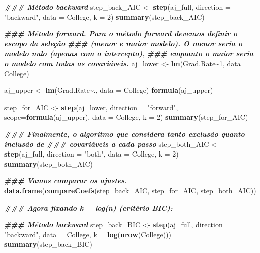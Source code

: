 \documentclass[
]{article}
\newenvironment{Shaded}{\begin{snugshade}}{\end{snugshade}}
\newcommand{\AttributeTok}[1]{\textcolor[rgb]{0.13,0.29,0.53}{#1}}
\newcommand{\DecValTok}[1]{\textcolor[rgb]{0.00,0.00,0.81}{#1}}
\newcommand{\DocumentationTok}[1]{\textcolor[rgb]{0.56,0.35,0.01}{\textbf{\textit{#1}}}}
\newcommand{\FunctionTok}[1]{\textcolor[rgb]{0.13,0.29,0.53}{\textbf{#1}}}
\newcommand{\NormalTok}[1]{#1}
\newcommand{\OtherTok}[1]{\textcolor[rgb]{0.56,0.35,0.01}{#1}}
\newcommand{\SpecialCharTok}[1]{\textcolor[rgb]{0.81,0.36,0.00}{\textbf{#1}}}
\newcommand{\StringTok}[1]{\textcolor[rgb]{0.31,0.60,0.02}{#1}}
\begin{document}
{\begin{Shaded}
\begin{Highlighting}[]
\DocumentationTok{\#\#\# Método backward}
\NormalTok{step\_back\_AIC }\OtherTok{\textless{}{-}} \FunctionTok{step}\NormalTok{(aj\_full, }\AttributeTok{direction =} \StringTok{"backward"}\NormalTok{, }\AttributeTok{data =}\NormalTok{ College, }\AttributeTok{k =} \DecValTok{2}\NormalTok{)}
\FunctionTok{summary}\NormalTok{(step\_back\_AIC)}

\DocumentationTok{\#\#\# Método forward. Para o método forward devemos definir o escopo da seleção}
\DocumentationTok{\#\#\# (menor e maior modelo). O menor seria o modelo nulo (apenas com o intercepto),}
\DocumentationTok{\#\#\# enquanto o maior seria o modelo com todas as covariáveis.}
\NormalTok{aj\_lower }\OtherTok{\textless{}{-}} \FunctionTok{lm}\NormalTok{(Grad.Rate}\SpecialCharTok{\textasciitilde{}}\DecValTok{1}\NormalTok{, }\AttributeTok{data =}\NormalTok{ College)}

\NormalTok{aj\_upper }\OtherTok{\textless{}{-}} \FunctionTok{lm}\NormalTok{(Grad.Rate}\SpecialCharTok{\textasciitilde{}}\NormalTok{., }\AttributeTok{data =}\NormalTok{ College)}
\FunctionTok{formula}\NormalTok{(aj\_upper)}

\NormalTok{step\_for\_AIC }\OtherTok{\textless{}{-}} \FunctionTok{step}\NormalTok{(aj\_lower, }\AttributeTok{direction =} \StringTok{"forward"}\NormalTok{, }\AttributeTok{scope=}\FunctionTok{formula}\NormalTok{(aj\_upper), }
                     \AttributeTok{data =}\NormalTok{ College, }\AttributeTok{k =} \DecValTok{2}\NormalTok{)}
\FunctionTok{summary}\NormalTok{(step\_for\_AIC)}

\DocumentationTok{\#\#\# Finalmente, o algoritmo que considera tanto exclusão quanto inclusão de}
\DocumentationTok{\#\#\# covariáveis a cada passo}
\NormalTok{step\_both\_AIC }\OtherTok{\textless{}{-}} \FunctionTok{step}\NormalTok{(aj\_full, }\AttributeTok{direction =} \StringTok{"both"}\NormalTok{, }\AttributeTok{data =}\NormalTok{ College, }\AttributeTok{k =} \DecValTok{2}\NormalTok{)}
\FunctionTok{summary}\NormalTok{(step\_both\_AIC)}

\DocumentationTok{\#\#\# Vamos comparar os ajustes.}
\FunctionTok{data.frame}\NormalTok{(}\FunctionTok{compareCoefs}\NormalTok{(step\_back\_AIC, step\_for\_AIC, step\_both\_AIC))}


\DocumentationTok{\#\#\# Agora fixando k = log(n) (critério BIC):}

\DocumentationTok{\#\#\# Método backward}
\NormalTok{step\_back\_BIC }\OtherTok{\textless{}{-}} \FunctionTok{step}\NormalTok{(aj\_full, }\AttributeTok{direction =} \StringTok{"backward"}\NormalTok{, }\AttributeTok{data =}\NormalTok{ College, }\AttributeTok{k =} \FunctionTok{log}\NormalTok{(}\FunctionTok{nrow}\NormalTok{(College)))}
\FunctionTok{summary}\NormalTok{(step\_back\_BIC)}


\end{Highlighting}
\end{Shaded}}
\end{document}
